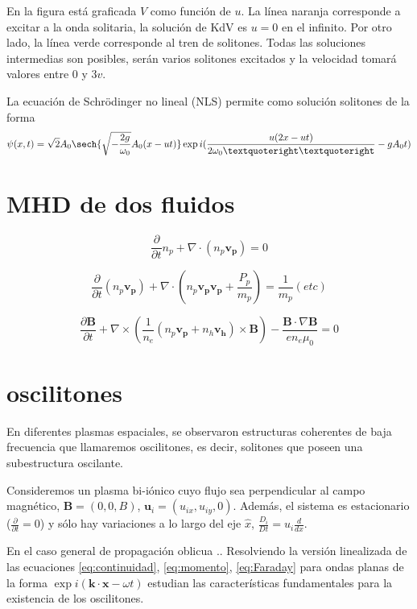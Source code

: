 \documentclass[11pt]{article}
\begin{document}
    En la figura %
    está graficada $V$ como función de $u$.
    La línea naranja corresponde a excitar a la onda solitaria, la solución de KdV es $u=0$ en el infinito.
    Por otro lado, la línea verde corresponde al tren de solitones.
    Todas las soluciones intermedias son posibles, serán varios solitones excitados y la velocidad tomará valores entre 0 y $3v$.

    La ecuación de Schrödinger no lineal (NLS) permite como solución solitones de la forma
    \begin{equation}
        \psi(x,t) = \sqrt{2} A_0 \sech{\sqrt{-\frac{2g}{\omega_0}} A_0(x - u t)} \exp{i (\frac{u (2x-ut)}{2\omega_0’’} - g A_0 t)}
        \label{eq:soliton_NLS}
    \end{equation}


    \section{MHD de dos fluidos}\label{sec:MHD}

    \begin{equation}
        \frac{\partial}{\partial t} n_p + \nabla \cdot (n_p \mathbf{v_p}) = 0
    \label{eq:continuidad}
    \end{equation}

    \begin{equation}
        \frac{\partial}{\partial t} (n_p \mathbf{v_p}) + \nabla \cdot (n_p \mathbf{v_p} \mathbf{v_p} + \frac{P_p}{m_p}) =
        \frac{1}{m_p} (etc)
    \label{eq:momento}
    \end{equation}

    \begin{equation}
        \frac{\partial \mathbf{B}}{\partial t} + \nabla \times (\frac{1}{n_e}(n_p \mathbf{v_p} + n_h \mathbf{v_h}) \times \mathbf{B}) -
        \frac{\mathbf{B}\cdot \nabla \mathbf{B}}{e n_e \mu_0} = 0
        \label{eq:Faraday}
    \end{equation}
    \section{oscilitones}\label{sec:oscilitones}

    En diferentes plasmas espaciales, se observaron estructuras coherentes de baja frecuencia que llamaremos
    oscilitones, es decir, solitones que poseen una subestructura oscilante.

    Consideremos un plasma bi-iónico cuyo flujo sea perpendicular al campo magnético, $\mathbf{B} = (0,0,B)$, $\mathbf{u}_i = (u_{ix}, u_{iy}, 0)$.
    Además, el sistema es estacionario ($\frac{\partial}{\partial t} = 0$) y sólo hay variaciones a lo largo del eje $\hat x$, $\frac{D_i}{Dt} = u_i \frac{d}{dx}$.
    \citep{McKenzie2001}


    En el caso general de propagación oblicua \citep{Sauer2001} ..
    Resolviendo la versión linealizada de las ecuaciones \ref{eq:continuidad}, \ref{eq:momento}, \ref{eq:Faraday}
    para ondas planas de la forma $\exp{i (\mathbf{k}\cdot \mathbf{x} - \omega t) }$ estudian las características
    fundamentales para la existencia de los oscilitones.
\end{document}
